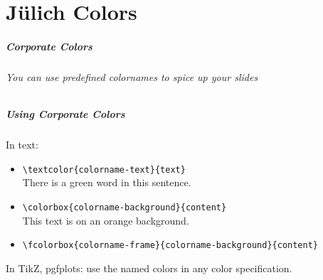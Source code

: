 %
\part{Jülich Colors}
\makepart

\begin{frame}[label=colors]
  \frametitle{Corporate Colors}
  \framesubtitle{You can use predefined colornames to spice up your slides}
  \centering
\end{frame}

\begin{frame}[fragile]
    \frametitle{Using Corporate Colors}
    In text:
    \begin{itemize}
        \item \verb+\textcolor{colorname-text}{text}+\\
            There is a \textcolor{fzjgreen}{green} word in this sentence.
        \item \verb+\colorbox{colorname-background}{content}+\\
            \colorbox{fzjorange}{This text is on an \textcolor{fzjred}{orange} background.}
        \item \verb+\fcolorbox{colorname-frame}{colorname-background}{content}+\\
    \end{itemize}

    In TikZ, pgfplots: use the named colors in any color specification.
\end{frame}
